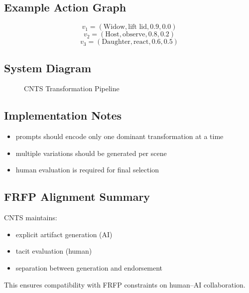 \documentclass[preprints,article,submit,pdftex,moreauthors,accept]{Definitions/mdpi}
\begin{document}
\subsection{Example Action Graph}

\[
v_1 = (\text{Widow}, \text{lift lid}, 0.9, 0.0)
\]
\[
v_2 = (\text{Host}, \text{observe}, 0.8, 0.2)
\]
\[
v_3 = (\text{Daughter}, \text{react}, 0.6, 0.5)
\]

\subsection{System Diagram}

\begin{figure}[h]
\centering
{}
\caption{CNTS Transformation Pipeline}
\end{figure}

\subsection{Implementation Notes}

\begin{itemize}
\item prompts should encode only one dominant transformation at a time
\item multiple variations should be generated per scene
\item human evaluation is required for final selection
\end{itemize}

\subsection{FRFP Alignment Summary}

CNTS maintains:

\begin{itemize}
\item explicit artifact generation (AI)
\item tacit evaluation (human)
\item separation between generation and endorsement
\end{itemize}

This ensures compatibility with FRFP constraints on human–AI collaboration.

\end{document}
